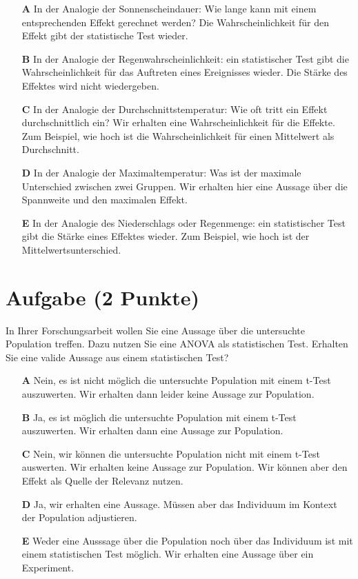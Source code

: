 \documentclass[a4paper, 9pt]{scrartcl}\usepackage[]{graphicx}\usepackage[]{xcolor}
\begin{document}
\begin{enumerate}
\item [\textbf{A} \msquare] In der Analogie der Sonnenscheindauer: Wie lange kann mit einem entsprechenden Effekt gerechnet werden? Die Wahrscheinlichkeit für den Effekt gibt der statistische Test wieder.
\item [\textbf{B} \msquare] In der Analogie der Regenwahrscheinlichkeit: ein statistischer Test gibt die Wahrscheinlichkeit für das Auftreten eines Ereignisses wieder. Die Stärke des Effektes wird nicht wiedergeben.
\item [\textbf{C} \msquare] In der Analogie der Durchschnittstemperatur: Wie oft tritt ein Effekt durchschnittlich ein? Wir erhalten eine Wahrscheinlichkeit für die Effekte. Zum Beispiel, wie hoch ist die Wahrscheinlichkeit für einen Mittelwert als Durchschnitt.
\item [\textbf{D} \msquare] In der Analogie der Maximaltemperatur: Was ist der maximale Unterschied zwischen zwei Gruppen. Wir erhalten hier eine Aussage über die Spannweite und den maximalen Effekt.
\item [\textbf{E} \msquare] In der Analogie des Niederschlags oder Regenmenge: ein statistischer Test gibt die Stärke eines Effektes wieder. Zum Beispiel, wie hoch ist der Mittelwertsunterschied.
\end{enumerate}

\section{Aufgabe \hfill (2 Punkte)}



In Ihrer Forschungsarbeit wollen Sie eine Aussage über die untersuchte Population treffen. Dazu nutzen Sie eine ANOVA als statistischen Test. Erhalten Sie eine valide Aussage aus einem statistischen Test?



\begin{enumerate}
\item [\textbf{A} \msquare] Nein, es ist nicht möglich die untersuchte Population mit einem t-Test auszuwerten. Wir erhalten dann leider keine Aussage zur Population.
\item [\textbf{B} \msquare] Ja, es ist möglich die untersuchte Population mit einem t-Test auszuwerten. Wir erhalten dann eine Aussage zur Population.
\item [\textbf{C} \msquare] Nein, wir können die untersuchte Population nicht mit einem t-Test auswerten. Wir erhalten keine Aussage zur Population. Wir können aber den Effekt als Quelle der Relevanz nutzen.
\item [\textbf{D} \msquare] Ja, wir erhalten eine Aussage. Müssen aber das Individuum im Kontext der Population adjustieren.
\item [\textbf{E} \msquare] Weder eine Ausssage über die Population noch über das Individuum ist mit einem statistischen Test möglich. Wir erhalten eine Aussage über ein Experiment.
\end{enumerate}
\end{document}
